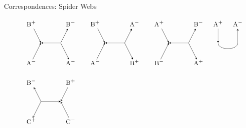 \documentclass{beamer}
\begin{document}
\begin{frame}{Correspondences: Spider Webs}
\begin{figure}[h!]
\[\begin{tikzpicture}
			\node (i21) at (.5,-3) {$\textsc{\small B}^+$};
			\node (ii21) at (2.5,-3) {$\textsc{\small B}^-$};
			\node (d21) at (1,-4) {};
			\node (dd21) at (2,-4) {};
			\node (o21) at (.5,-5) {$\textsc{\small A}^-$};
			\node (oo21) at (2.5,-5) {$\textsc{\small A}^-$};
			\draw[->,>=stealth] (i21) -- (d21.center);
			\draw[<-,>=stealth] (ii21) -- (dd21.center);
			\draw[<-,>=stealth] (d21.center) -- (dd21.center);
			\draw[<-,>=stealth, shorten >=5pt] (d21.center) -- (o21.center);
			\draw[->,>=stealth, shorten >=5pt] (dd21.center) -- (oo21.center);
			
			\node (i22) at (3.75,-3) {$\textsc{\small B}^+$};
			\node (ii22) at (5.75,-3) {$\textsc{\small A}^-$};
			\node (d22) at (4.25,-4) {};
			\node (dd22) at (5.25,-4) {};
			\node (o22) at (3.75,-5) {$\textsc{\small A}^-$};
			\node (oo22) at (5.75,-5) {$\textsc{\small B}^+$};
			\draw[->,>=stealth] (i22) -- (d22.center);
			\draw[<-,>=stealth] (ii22) -- (dd22.center);
			\draw[<-,>=stealth] (d22.center) -- (dd22.center);
			\draw[<-,>=stealth, shorten >=5pt] (d22.center) -- (o22.center);
			\draw[->,>=stealth, shorten >=5pt] (dd22.center) -- (oo22.center);
			
			\node (i23) at (7,-3) {$\textsc{\small A}^+$};
			\node (ii23) at (9,-3) {$\textsc{\small B}^-$};
			\node (d23) at (7.5,-4) {};
			\node (dd23) at (8.5,-4) {};
			\node (o23) at (7,-5) {$\textsc{\small B}^-$};
			\node (oo23) at (9,-5) {$\textsc{\small A}^+$};
			\draw[->,>=stealth] (i23) -- (d23.center);
			\draw[<-,>=stealth] (ii23) -- (dd23.center);
			\draw[<-,>=stealth] (d23.center) -- (dd23.center);
			\draw[<-,>=stealth, shorten >=5pt] (d23.center) -- (o23.center);
			\draw[->,>=stealth, shorten >=5pt] (dd23.center) -- (oo23.center);
			
			\node (i24) at (10,-3) {$\textsc{\small A}^+$};
			\node (ii24) at (11,-3) {$\textsc{\small A}^-$};
			\node (d24) at (10,-4) {};
			\node (dd24) at (11,-4) {};
			\draw[->,>=stealth] (i24) -- (d24.center);
			\draw[<-,>=stealth] (ii24) -- (dd24.center);
			\draw (d24.center) edge [-,>=stealth,bend right=90] (dd24.center);
			
			\node (i31) at (.5,-6) {$\textsc{\small B}^-$};
			\node (ii31) at (2.5,-6) {$\textsc{\small B}^+$};
			\node (d31) at (1,-7) {};
			\node (dd31) at (2,-7) {};
			\node (o31) at (.5,-8) {$\textsc{\small C}^+$};
			\node (oo31) at (2.5,-8) {$\textsc{\small C}^-$};
			\draw[<-,>=stealth] (i31) -- (d31.center);
			\draw[->,>=stealth] (ii31) -- (dd31.center);
			\draw[->,>=stealth] (d31.center) -- (dd31.center);
			\draw[->,>=stealth, shorten >=5pt] (d31.center) -- (o31.center);
			\draw[<-,>=stealth, shorten >=5pt] (dd31.center) -- (oo31.center);
			

\end{tikzpicture}\]
\end{figure}
\end{frame}
\end{document}
